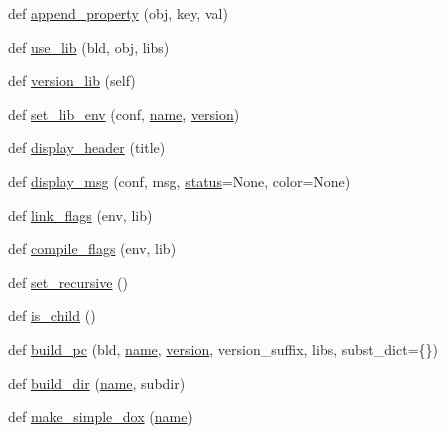 \begin{DoxyCompactItemize}
\item 
def \hyperlink{namespacewaflib_1_1extras_1_1autowaf_afa6b6d171df50c28e7716ced53531c28}{append\+\_\+property} (obj, key, val)
\item 
def \hyperlink{namespacewaflib_1_1extras_1_1autowaf_a1e4b5ff71300f60a145698ab26652bbf}{use\+\_\+lib} (bld, obj, libs)
\item 
def \hyperlink{namespacewaflib_1_1extras_1_1autowaf_a754a91b58a248a1a3544336935ae3c97}{version\+\_\+lib} (self)
\item 
def \hyperlink{namespacewaflib_1_1extras_1_1autowaf_a01ed75513ca7e8dba61371b2c8436fb2}{set\+\_\+lib\+\_\+env} (conf, \hyperlink{lib_2expat_8h_a1b49b495b59f9e73205b69ad1a2965b0}{name}, \hyperlink{lib_2expat_8h_aec5db107b91447a96c47961ce9df2660}{version})
\item 
def \hyperlink{namespacewaflib_1_1extras_1_1autowaf_a681e2d13fe20ee08a9aedae3e3639559}{display\+\_\+header} (title)
\item 
def \hyperlink{namespacewaflib_1_1extras_1_1autowaf_a172925822ac841519e6d0cbf64db2763}{display\+\_\+msg} (conf, msg, \hyperlink{rfft2d_test_m_l_8m_a1b5437a866e6f95107b07ba845bc1800}{status}=None, color=None)
\item 
def \hyperlink{namespacewaflib_1_1extras_1_1autowaf_aae8dbef5afacdec7d2986e87310a9a65}{link\+\_\+flags} (env, lib)
\item 
def \hyperlink{namespacewaflib_1_1extras_1_1autowaf_a60d947e8bd1f3eedc65659dd397034e5}{compile\+\_\+flags} (env, lib)
\item 
def \hyperlink{namespacewaflib_1_1extras_1_1autowaf_a0c24e7747f55c7758eef2c21f9fc7c05}{set\+\_\+recursive} ()
\item 
def \hyperlink{namespacewaflib_1_1extras_1_1autowaf_ac1301a2a7a405a207c434e0be3130f7d}{is\+\_\+child} ()
\item 
def \hyperlink{namespacewaflib_1_1extras_1_1autowaf_a377bdb8d79f551ca4d0ff4866b046fe1}{build\+\_\+pc} (bld, \hyperlink{lib_2expat_8h_a1b49b495b59f9e73205b69ad1a2965b0}{name}, \hyperlink{lib_2expat_8h_aec5db107b91447a96c47961ce9df2660}{version}, version\+\_\+suffix, libs, subst\+\_\+dict=\{\})
\item 
def \hyperlink{namespacewaflib_1_1extras_1_1autowaf_a6cf22a96f4a27c7ae98a7adc1561bdb1}{build\+\_\+dir} (\hyperlink{lib_2expat_8h_a1b49b495b59f9e73205b69ad1a2965b0}{name}, subdir)
\item 
def \hyperlink{namespacewaflib_1_1extras_1_1autowaf_a2cdf474b0fc857e31088b6c557551adf}{make\+\_\+simple\+\_\+dox} (\hyperlink{lib_2expat_8h_a1b49b495b59f9e73205b69ad1a2965b0}{name})

\end{DoxyCompactItemize}
